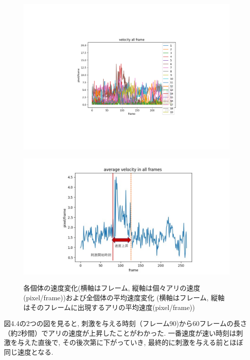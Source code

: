 ﻿\documentclass[a4paper, 12pt]{jsreport}
\begin{document}
\begin{figure}[tbp]
    \begin{minipage}{0.8\hsize}
        \centering
        \includegraphics[width=1.3\linewidth]{all_frma.pdf}

        \label{fig:fig11a}
    \end{minipage}
    \begin{minipage}{0.8\hsize}
        \centering
        \includegraphics[width=1.3\linewidth]{2.pdf}
       
        \label{fig:fig11b}
    \end{minipage}
    \caption{各個体の速度変化(横軸はフレーム, 縦軸は個々アリの速度(pixel/frame))および全個体の平均速度変化 (横軸はフレーム, 縦軸はそのフレームに出現するアリの平均速度(pixel/frame))}
    \label{fig:fig11}
\end{figure}

図4.4の2つの図を見ると, 刺激を与える時刻（フレーム90)から60フレームの長さ（約2秒間）でアリの速度が上昇したことがわかった. 一番速度が速い時刻は刺激を与えた直後で, その後次第に下がっていき, 最終的に刺激を与える前とほぼ同じ速度となる. 
\end{document}
